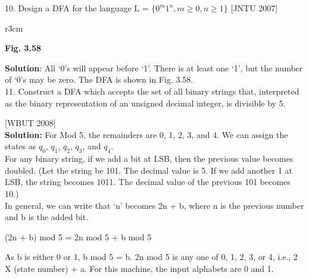 \documentclass [10pt,a4paper,tikz] {book}
\begin{document}
{10. Design a DFA for the language L = $\{0^{m}1^{n},m\geq0,n\geq1\}$ [JNTU 2007]\\


\begin{wrapfigure}{r}{3cm}

\begin{center}
 \textbf{Fig. 3.58 }
\end{center}

\end{wrapfigure}


\textbf{Solution}: All ‘0’s will appear before ‘1’. There is at least one
‘1’, but the number of ‘0’s may be zero. The DFA is shown in
Fig. 3.58.\\

11. Construct a DFA which accepts the set of all binary strings that,
interpreted as the binary representation of an unsigned decimal
integer, is divisible by 5.

[WBUT 2008]\\

\textbf{Solution:} For Mod 5, the remainders are 0, 1, 2, 3, and 4. We can assign the states as $q_0$, $q_1$, $q_2$,
$q_3$, and $q_4$.
\\For any binary string, if we add a bit at LSB, then the previous value becomes doubled. (Let
the string be 101. The decimal value is 5. If we add another 1 at LSB, the string becomes 1011.
The decimal value of the previous 101 becomes 10.)
\\In general, we can write that ‘n’ becomes 2n + b, where n is the previous number and b is the
added bit.

\begin{center}

(2n + b) mod 5 = 2n mod 5 + b mod 5

\end{center}
As b is either 0 or 1, b mod 5 = b.
2n mod 5 is any one of 0, 1, 2, 3, or 4, i.e., 2 X (state number) + a.
For this machine, the input alphabets are 0 and 1.

}
\end{document}
